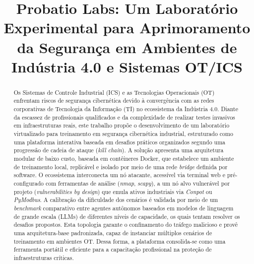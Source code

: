 \documentclass[conference]{IEEEtran}
\begin{document}
\title{Probatio Labs: Um Laboratório Experimental para Aprimoramento da Segurança em Ambientes de Indústria 4.0 e Sistemas OT/ICS}

\author{
    \and
}

\maketitle

\begin{abstract}
Os Sistemas de Controle Industrial (ICS) e as Tecnologias Operacionais (OT) enfrentam riscos de segurança cibernética devido à convergência com as redes corporativas de Tecnologia da Informação (TI) no ecossistema da Indústria 4.0. Diante da escassez de profissionais qualificados e da complexidade de realizar testes invasivos em infraestruturas reais, este trabalho propõe o desenvolvimento de um laboratório virtualizado para treinamento em segurança cibernética industrial, estruturado como uma plataforma interativa baseada em desafios práticos organizados segundo uma progressão de cadeia de ataque (\textit{kill chain}). A solução apresenta uma arquitetura modular de baixo custo, baseada em contêineres Docker, que estabelece um ambiente de treinamento local, replicável e isolado por meio de uma rede \textit{bridge} definida por software. O ecossistema interconecta um nó atacante, acessível via terminal web e pré-configurado com ferramentas de análise (\textit{nmap}, \textit{scapy}), a um nó alvo vulnerável por projeto (\textit{vulnerabilities by design}) que emula ativos industriais via \textit{Conpot} ou \textit{PyModbus}. A calibração da dificuldade dos cenários é validada por meio de um \textit{benchmark} comparativo entre agentes autônomos baseados em modelos de linguagem de grande escala (LLMs) de diferentes níveis de capacidade, os quais tentam resolver os desafios propostos. Esta topologia garante o confinamento do tráfego malicioso e provê uma arquitetura-base padronizada, capaz de instanciar múltiplos cenários de treinamento em ambientes OT. Dessa forma, a plataforma consolida-se como uma ferramenta portátil e eficiente para a capacitação profissional na proteção de infraestruturas críticas.
\end{abstract}
\end{document}
